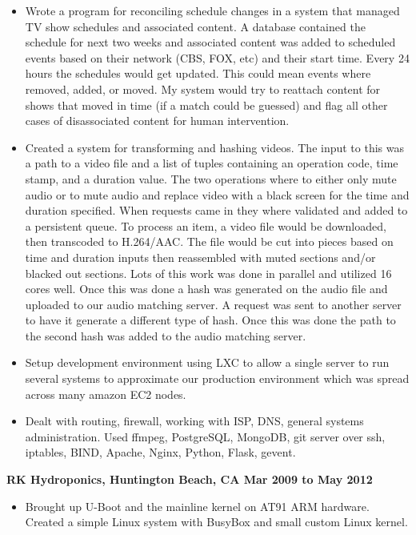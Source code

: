 \documentclass{res}
\begin{document}
\begin{resume}
\begin{itemize}
\item
	Wrote a program for reconciling schedule changes in a system that
	managed TV show schedules and associated content.  A database
	contained the schedule for next two weeks and associated content
	was added to scheduled events based on their network (CBS, FOX,
	etc) and their start time.  Every 24 hours the schedules would
	get updated.  This could mean events where removed, added,
	or moved.  My system would try to reattach content for shows
	that moved in time (if a match could be guessed) and flag all
	other cases of disassociated content for human intervention.
\item
	Created a system for transforming and hashing videos.  The
	input to this was a path to a video file and a list of tuples
	containing an operation code, time stamp, and a duration value.
	The two operations where to either only mute audio or to mute
	audio and replace video with a black screen for the time and
	duration specified.  When requests came in they where validated
	and added to a persistent queue.  To process an item, a video
	file would be downloaded, then transcoded to H.264/AAC.  The file
	would be cut into pieces based on time and duration inputs then
	reassembled with muted sections and/or blacked out sections.
	Lots of this work was done in parallel and utilized 16 cores well.
	Once this was done a hash was generated on the audio file and
	uploaded to our audio matching server.	A request was sent to
	another server to have it generate a different type of hash.
	Once this was done the path to the second hash was added to the
	audio matching server.

\item
	Setup  development  environment using LXC to allow a single
	server to run several systems to approximate our production
	environment which was spread across many amazon EC2 nodes.

\item
	Dealt with routing, firewall, working with ISP, DNS, general
	systems administration.  Used ffmpeg, PostgreSQL, MongoDB,
	git server over ssh, iptables, BIND, Apache, Nginx, Python,
	Flask, gevent.

\end{itemize}


{\large \bf RK Hydroponics, Huntington Beach, CA \hfill Mar 2009 to
May 2012}

\begin{itemize}

\item
	Brought up U-Boot and the mainline kernel on AT91 ARM hardware.
	Created a simple Linux system with BusyBox and small custom
	Linux kernel.


\end{itemize}
\end{resume}
\end{document}
